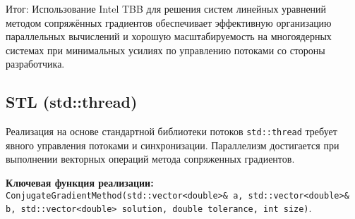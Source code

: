 \documentclass[12pt]{article}
\begin{document}
Итог:
Использование Intel TBB для решения систем линейных уравнений методом сопряжённых градиентов обеспечивает эффективную организацию параллельных вычислений и хорошую масштабируемость на многоядерных системах при минимальных усилиях по управлению потоками со стороны разработчика.


\subsection{STL (std::thread)}

Реализация на основе стандартной библиотеки потоков \texttt{std::thread} требует явного управления потоками и синхронизации. Параллелизм достигается при выполнении векторных операций метода сопряженных градиентов.

\textbf{Ключевая функция реализации:} \texttt{ConjugateGradientMethod(std::vector<double>\& a, std::vector<double>\& b, std::vector<double> solution, double tolerance, int size)}.
\end{document}
